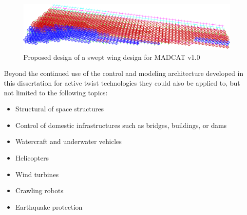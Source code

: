 \documentclass[11pt]{ucthesis}
\begin{document}
\begin{figure}[thpb]
\centering
\includegraphics[width=0.75\linewidth]{./Figures/MADCATSwept.png}
\caption{Proposed design of a swept wing design for MADCAT v1.0}
\label{fig:MADCAT}
\end{figure}

Beyond the continued use of the control and modeling architecture developed in this dissertation for active twist technologies they could also be applied to, but not limited to the following topics:

\begin{itemize}
\item Structural of space structures
\item Control of domestic infrastructures such as bridges, buildings, or dams
\item Watercraft and underwater vehicles
\item Helicopters
\item Wind turbines
\item Crawling robots
\item Earthquake protection
\end{itemize}


\nocite{*}



\appendix
\end{document}
